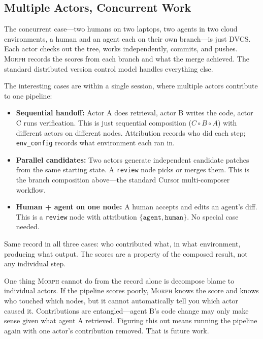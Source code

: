 \documentclass{article}
\begin{document}
\subsection{Multiple Actors, Concurrent Work}

The concurrent case---two humans on two laptops, two agents in two cloud
environments, a human and an agent each on their own branch---is just DVCS.
Each actor checks out the tree, works independently, commits, and pushes.
\textsc{Morph} records the scores from each branch and what the merge achieved.
The standard distributed version control model handles everything else.

The interesting cases are within a single session, where multiple actors
contribute to one pipeline:

\begin{itemize}[nosep]
  \item \textbf{Sequential handoff:} Actor A does retrieval, actor B writes the
    code, actor C runs verification. This is just sequential composition
    ($C \circ B \circ A$) with different actors on different nodes.
    Attribution records who did each step; \texttt{env\_config} records what
    environment each ran in.
  \item \textbf{Parallel candidates:} Two actors generate independent candidate
    patches from the same starting state. A \texttt{review} node picks or
    merges them. This is the branch composition above---the standard Cursor
    multi-composer workflow.
  \item \textbf{Human + agent on one node:} A human accepts and edits an
    agent's diff. This is a \texttt{review} node with attribution
    $\{\texttt{agent}, \texttt{human}\}$. No special case needed.
\end{itemize}

\noindent Same record in all three cases: who contributed what, in what
environment, producing what output. The scores are a property of the composed
result, not any individual step.

One thing \textsc{Morph} cannot do from the record alone is decompose
blame to individual actors. If the pipeline scores poorly,
\textsc{Morph} knows the score and knows who touched which nodes, but it cannot
automatically tell you which actor caused it. Contributions are
entangled---agent B's code change may only make sense given what
agent A retrieved. Figuring this out means running the pipeline again
with one actor's contribution removed. That is future work.
\end{document}
